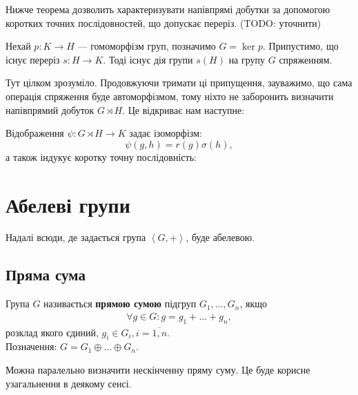 \documentclass{math_library}
\begin{document}
Нижче теорема дозволить характеризувати напівпрямі добутки за допомогою коротких точних послідовностей, що допускає переріз. (TODO: уточнити)

\begin{lemma}
Нехай $p \colon K \to H$ --- гомоморфізм груп, позначимо $G = \ker p$. Припустимо, що існує переріз $s \colon H \to K$. Тоді існує дія групи $s(H)$ на групу $G$ спряженням.
\end{lemma}

Тут цілком зрозуміло. Продовжуючи тримати ці припущення, зауважимо, що сама операція спряження буде автоморфізмом, тому ніхто не заборонить визначити напівпрямий добуток $G \rtimes H$. Це відкриває нам наступне:

\begin{theorem}
Відображення $\psi \colon G \rtimes H \to K$ задає ізоморфізм:
\[
\psi(g,h) = r(g) \sigma(h),
\]
а також індукує коротку точну послідовність:
\begin{figure}[H]
\centering
{}
\end{figure}
\end{theorem}

\iffalse
\newpage
\section{Абелеві групи}
Надалі всюди, де задається група $\left<G,+\right>$, буде абелевою.
\subsection{Пряма сума}
\begin{definition}
Група $G$ називається \textbf{прямою сумою} підгруп $G_1,\dots,G_n$, якщо
\begin{align*}
\forall g \in G: g = g_1 + \dots + g_n,
\end{align*}
розклад якого єдиний, $g_i \in G_i, i = \overline{1,n}$.\\
Позначення: $G = G_1 \oplus \dots \oplus G_n$.
\end{definition}

Можна паралельно визначити нескінченну пряму суму. Це буде корисне узагальнення в деякому сенсі.
\end{document}

